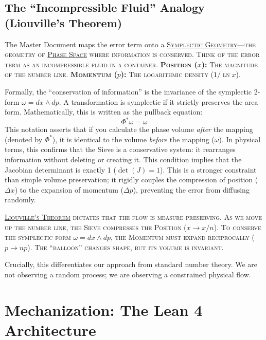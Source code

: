 \documentclass[sn-mathphys-num, pdflatex, referee]{sn-jnl}
\newcommand{\gterm}[2]{\begingroup\normalfont\scshape\hyperlink{#1}{#2}\endgroup}
\begin{document}
\subsection{The ``Incompressible Fluid'' Analogy (Liouville's Theorem)}
The Master Document maps the error term onto a \gterm{geometry}{Symplectic Geometry}---the geometry of \gterm{phase_space}{Phase Space} where information is conserved.
Think of the error term as an incompressible fluid in a container. \textbf{Position ($x$):} The magnitude of the number line.  \textbf{Momentum ($p$):} The logarithmic density ($1/\ln x$).


\begin{sidebar}[frametitle={Technical Insight: The Symplectic Form}]
Formally, the ``conservation of information'' is the invariance of the symplectic 2-form $\omega = dx \wedge dp$. 
A transformation is symplectic if it strictly preserves the area form. Mathematically, this is written as the pullback equation:
\begin{equation}
\Phi^*\omega = \omega
\end{equation}
This notation asserts that if you calculate the phase volume \textit{after} the mapping (denoted by $\Phi^*$), it is identical to the volume \textit{before} the mapping ($\omega$). In physical terms, this confirms that the Sieve is a conservative system: it rearranges information without deleting or creating it. This condition implies that the Jacobian determinant is exactly 1 ($\det(J)=1$). This is a stronger constraint than simple volume preservation; it rigidly couples the compression of position ($\Delta x$) to the expansion of momentum ($\Delta p$), preventing the error from diffusing randomly.
\end{sidebar}

\gterm{liouville}{Liouville's Theorem} dictates that the flow is measure-preserving. As we move up the number line, the Sieve compresses the Position ($x \to x/n$). To conserve the symplectic form $\omega = dx \wedge dp$, the Momentum must expand reciprocally ($p \to np$). The ``balloon'' changes shape, but its volume is invariant.

Crucially, this differentiates our approach from standard number theory. We are not observing a random process; we are observing a constrained physical flow.

\section{Mechanization: The Lean 4 Architecture}
\end{document}
